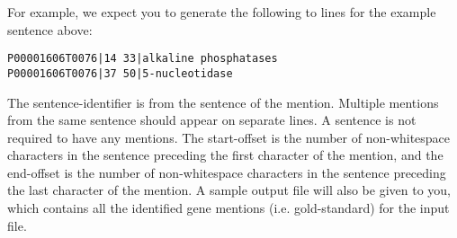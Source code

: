 For example, we expect you to generate the following to lines for the example
sentence above:

\begin{verbatim}
P00001606T0076|14 33|alkaline phosphatases
P00001606T0076|37 50|5-nucleotidase
\end{verbatim}

The sentence-identifier is from the sentence of the mention. Multiple mentions
from the same sentence should appear on separate lines. A sentence is not
required to have any mentions. The start-offset is the number of non-whitespace
characters in the sentence preceding the first character of the mention, and the
end-offset is the number of non-whitespace characters in the sentence preceding
the last character of the mention. A sample output file will also be given to
you, which contains all the identified gene mentions (i.e. gold-standard) for
the input file.
